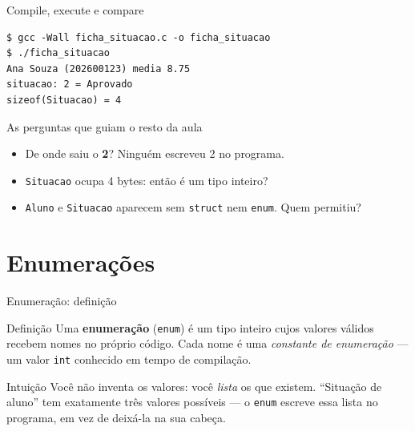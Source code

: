 \documentclass[aspectratio=169]{beamer}
\begin{document}
\begin{frame}[fragile]{Compile, execute e compare}
\begin{lstlisting}[language={}, numbers=none, basicstyle=\ttfamily\small]
$ gcc -Wall ficha_situacao.c -o ficha_situacao
$ ./ficha_situacao
Ana Souza (202600123) media 8.75
situacao: 2 = Aprovado
sizeof(Situacao) = 4
\end{lstlisting}
  \begin{block}{As perguntas que guiam o resto da aula}
    \begin{itemize}
      \item De onde saiu o \textbf{2}? Ninguém escreveu 2 no programa.
      \item \texttt{Situacao} ocupa 4 bytes: então é um tipo inteiro?
      \item \texttt{Aluno} e \texttt{Situacao} aparecem sem \texttt{struct} nem
        \texttt{enum}. Quem permitiu?
    \end{itemize}
  \end{block}
\end{frame}

\section{Enumerações}

\begin{frame}{Enumeração: definição}
  \begin{block}{Definição}
    Uma \textbf{enumeração} (\texttt{enum}) é um tipo inteiro cujos valores
    válidos recebem nomes no próprio código. Cada nome é uma
    \emph{constante de enumeração} --- um valor \texttt{int} conhecido em tempo
    de compilação.
  \end{block}
  \begin{exampleblock}{Intuição}
    Você não inventa os valores: você \emph{lista} os que existem. ``Situação de
    aluno'' tem exatamente três valores possíveis --- o \texttt{enum} escreve
    essa lista no programa, em vez de deixá-la na sua cabeça.
  \end{exampleblock}
\end{frame}
\end{document}
